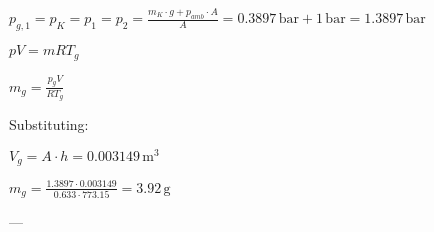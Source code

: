 \( p_{g,1} = p_{K} = p_{1} = p_{2} = \frac{m_K \cdot g + p_{amb} \cdot A}{A} = 0.3897 \, \text{bar} + 1 \, \text{bar} = 1.3897 \, \text{bar} \)  

\( pV = mRT_g \)  

\( m_g = \frac{p_g V}{RT_g} \)  

Substituting:  

\( V_g = A \cdot h = 0.003149 \, \text{m}^3 \)  

\( m_g = \frac{1.3897 \cdot 0.003149}{0.633 \cdot 773.15} = 3.92 \, \text{g} \)  

---